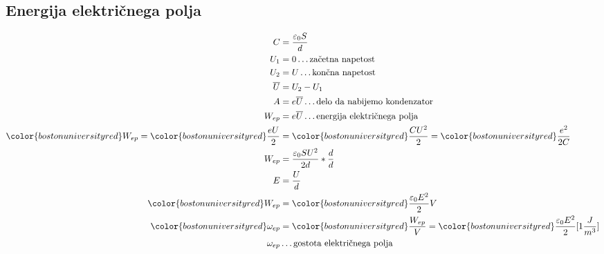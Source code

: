 {\color{indiagreen}\subsection{Energija električnega polja}}
\begin{align*}
	C &= \frac{\varepsilon_0 S}{d}\\
	U_1 &= 0 \dots \text{začetna napetost}\\
	U_2 &= U \dots \text{končna napetost}\\
	\overline{U} &= U_2 - U_1\\
	A &= e\overline{U} \dots \text{delo da nabijemo kondenzator}\\
	W_{ep} &= e\overline{U} \dots \text{energija električnega polja}\\
	{\color{bostonuniversityred}W_{ep}} = {\color{bostonuniversityred}\frac{eU}{2}} &= {\color{bostonuniversityred}\frac{CU^2}{2}} = {\color{bostonuniversityred}\frac{e^2}{2C}}\\
	W_{ep} &= \frac{\varepsilon_0 S U^2}{2d} * \frac{d}{d}\\
	E &= \frac{U}{d}\\
	{\color{bostonuniversityred}W_{ep}} &= {\color{bostonuniversityred}\frac{\varepsilon_0 E^2}{2} V}\\
	{\color{bostonuniversityred}\omega_{ep}} &= {\color{bostonuniversityred}\frac{W_{ep}}{V}} = {\color{bostonuniversityred}\frac{\varepsilon_0 E^2}{2}}[1\frac{J}{m^3}]\\
	\omega_{ep} &\dots \text{gostota električnega polja}\\
\end{align*}